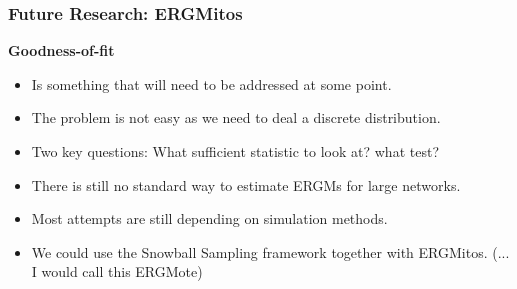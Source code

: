 \documentclass[aspectratio=169, 9pt]{beamer}
\begin{document}
\begin{frame}[t]
\frametitle{Future Research: ERGMitos}

{\bf Goodness-of-fit}\pause
\begin{itemize}
\item Is something that will need to be addressed at some point.\pause
\item The problem is not easy as we need to deal a discrete distribution.\pause
\item Two key questions: What sufficient statistic to look at? what test?
\end{itemize}

 \pause
\begin{itemize}
\item There is still no standard way to estimate ERGMs for large networks.\pause
\item Most attempts are still depending on simulation methods.\pause
\item We could use the Snowball Sampling framework together with ERGMitos.\pause{}
(... I would call this ERGMote)
\end{itemize}

\end{frame}

\end{document}
